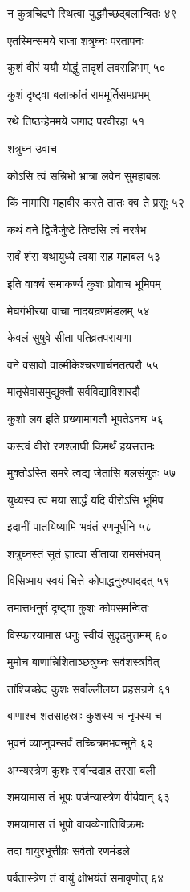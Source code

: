 न कुत्रचिद्रणे स्थित्वा युद्धमैच्छद्बलान्वितः ४९

एतस्मिन्समये राजा शत्रुघ्नः परतापनः

कुशं वीरं ययौ योद्धुं तादृशं लवसन्निभम् ५०

कुशं दृष्ट्वा बलाक्रांतं राममूर्तिसमप्रभम्

रथे तिष्ठन्हेममये जगाद परवीरहा ५१

शत्रुघ्न उवाच

कोऽसि त्वं सन्निभो भ्रात्रा लवेन सुमहाबलः

किं नामासि महावीर कस्ते तातः क्व ते प्रसूः ५२

कथं वने द्विजैर्जुष्टे तिष्ठसि त्वं नरर्षभ

सर्वं शंस यथायुध्ये त्वया सह महाबल ५३

इति वाक्यं समाकर्ण्य कुशः प्रोवाच भूमिपम्

मेघगंभीरया वाचा नादयन्रणमंडलम् ५४

केवलं सुषुवे सीता पतिव्रतपरायणा

वने वसावो वाल्मीकेश्चरणार्चनतत्परौ ५५

मातृसेवासमुद्युक्तौ सर्वविद्याविशारदौ

कुशो लव इति प्रख्यामागतौ भूपतेऽनघ ५६

कस्त्वं वीरो रणश्लाघी किमर्थं हयसत्तमः

मुक्तोऽस्ति समरे त्वद्य जेतासि बलसंयुतः ५७

युध्यस्व त्वं मया सार्द्धं यदि वीरोऽसि भूमिप

इदानीं पातयिष्यामि भवंतं रणमूर्धनि ५८

शत्रुघ्नस्तं सुतं ज्ञात्वा सीताया रामसंभवम्

विसिष्माय स्वयं चित्ते कोपाद्धनुरुपाददत् ५९

तमात्तधनुषं दृष्ट्वा कुशः कोपसमन्वितः

विस्फारयामास धनुः स्वीयं सुदृढमुत्तमम् ६०

मुमोच बाणान्निशिताञ्छत्रुघ्नः सर्वशस्त्रवित्

तांश्चिच्छेद कुशः सर्वांल्लीलया प्रहसन्रणे ६१

बाणाश्च शतसाहस्राः कुशस्य च नृपस्य च

भुवनं व्याप्नुवन्सर्वं तच्चित्रमभवन्मुने ६२

अग्न्यस्त्रेण कुशः सर्वान्ददाह तरसा बली

शमयामास तं भूपः पर्जन्यास्त्रेण वीर्यवान् ६३

शमयामास तं भूपो वायव्येनातिविक्रमः

तदा वायुरभूत्तीव्रः सर्वतो रणमंडले

पर्वतास्त्रेण तं वायुं क्षोभयंतं समावृणोत् ६४

